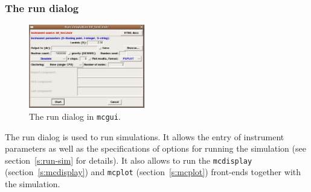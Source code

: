 \subsubsection{The run dialog}

\begin{figure}[htb!]
  \begin{center}
    \includegraphics[width=0.45\textwidth]{figures/mcgui-run}
  \end{center}
\caption{The run dialog in \texttt{mcgui}.}
\label{fig:mcgui-run}
\end{figure}
%
The run dialog is used to run simulations. It allows the entry of instrument
parameters as well as the specifications of options for running the simulation
(see section~\ref{s:run-sim} for details). It also allows to run the
\verb+mcdisplay+ (section~\ref{s:mcdisplay}) and \verb+mcplot+
(section~\ref{s:mcplot}) front-ends together with the
simulation.

